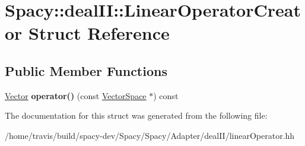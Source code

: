 \hypertarget{structSpacy_1_1dealII_1_1LinearOperatorCreator}{\section{Spacy\-:\-:deal\-I\-I\-:\-:Linear\-Operator\-Creator Struct Reference}
\label{structSpacy_1_1dealII_1_1LinearOperatorCreator}
}
\subsection*{Public Member Functions}
\begin{DoxyCompactItemize}
\item 
\hypertarget{structSpacy_1_1dealII_1_1LinearOperatorCreator_a2f608aa462b65fe69bfa8e61659f6534}{\hyperlink{group__VectorSpaceGroup_ga65d64ee5f22f492639d0f950aa931071}{Vector} {\bfseries operator()} (const \hyperlink{classSpacy_1_1VectorSpace}{Vector\-Space} $\ast$) const }\label{structSpacy_1_1dealII_1_1LinearOperatorCreator_a2f608aa462b65fe69bfa8e61659f6534}

\end{DoxyCompactItemize}


The documentation for this struct was generated from the following file\-:\begin{DoxyCompactItemize}
\item 
/home/travis/build/spacy-\/dev/\-Spacy/\-Spacy/\-Adapter/deal\-I\-I/linear\-Operator.\-hh\end{DoxyCompactItemize}
